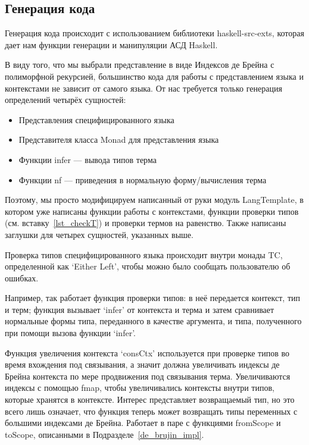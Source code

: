 \subsection{Генерация кода}
Генерация кода происходит с использованием библиотеки haskell-src-exts\cite{src_exts}, которая дает нам функции генерации и манипуляции АСД Haskell.

В виду того, что мы выбрали представление в виде Индексов де Брейна с полиморфной рекурсией, большинство кода для работы с представлением языка и контекстами не зависит от самого языка. От нас требуется только генерация определений четырёх сущностей:

\begin{itemize}
\item Представления специфицированного языка
\item Представителя класса Monad для представления языка
\item Функции infer --- вывода типов терма
\item Функции nf --- приведения в нормальную форму/вычисления терма
\end{itemize}

Поэтому, мы просто модифицируем написанный от руки модуль LangTemplate, в котором уже написаны функции работы с контекстами, функции проверки типов (см. вставку~\ref{lst_checkT}) и проверки термов на равенство. Также написаны заглушки для четырех сущностей, указанных выше.

Проверка типов специфицированного языка происходит внутри монады TC, определенной как `Either Left', чтобы можно было сообщать пользователю об ошибках.

Например, так работает функция проверки типов: в неё передается контекст, тип и терм; функция вызывает `infer' от контекста и терма и затем сравнивает нормальные формы типа, переданного в качестве аргумента, и типа, полученного при помощи вызова функции `infer'.

Функция увеличения контекста `consCtx' используется при проверке типов во время вхождения под связывания, а значит должна увеличивать индексы де Брейна контекста по мере продвижения под связывания терма. Увеличиваются индексы с помощью fmap, чтобы увеличивались контексты внутри типов, которые хранятся в контексте. Интерес представляет возвращаемый тип, но это всего лишь означает, что функция теперь может возвращать типы переменных с большими индексами де Брейна. Работает в паре с функциями fromScope и toScope, описанными в Подразделе~\ref{de_brujin_impl}.

